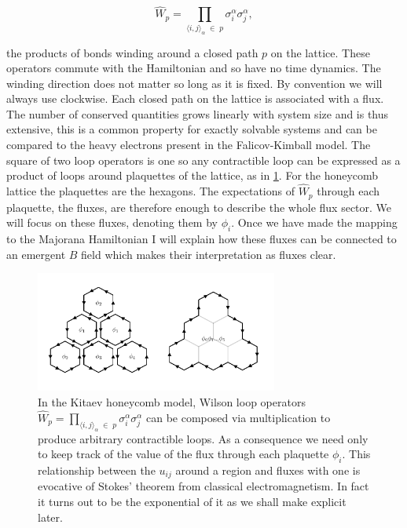 \[\hat{W}_p = \prod_{\langle i,j\rangle_\alpha\; \in\; p} \sigma_i^{\alpha}\sigma_j^{\alpha},\]

the products of bonds winding around a closed path \(p\) on the lattice. These operators commute with the Hamiltonian and so have no time dynamics. The winding direction does not matter so long as it is fixed. By convention we will always use clockwise. Each closed path on the lattice is associated with a flux. The number of conserved quantities grows linearly with system size and is thus extensive, this is a common property for exactly solvable systems and can be compared to the heavy electrons present in the Falicov-Kimball model. The square of two loop operators is one so any contractible loop can be expressed as a product of loops around plaquettes of the lattice, as in \cref{fig:stokes_theorem}. For the honeycomb lattice the plaquettes are the hexagons. The expectations of \(\hat{W}_p\) through each plaquette, the fluxes, are therefore enough to describe the whole flux sector. We will focus on these fluxes, denoting them by \(\phi_i\). Once we have made the mapping to the Majorana Hamiltonian I will explain how these fluxes can be connected to an emergent \(B\) field which makes their interpretation as fluxes clear.

\hypertarget{fig:stokes_theorem}{%
\begin{figure}
\centering
\includegraphics[width=0.71\textwidth,height=\textheight]{figure_code/amk_chapter/stokes_theorem/stokes_theorem}
\caption[{We can construct arbitrary loops from plaquette fluxes.}]{In the Kitaev honeycomb model, Wilson loop operators \(\hat{W}_p = \prod_{\langle i,j\rangle_\alpha\; \in\; p} \sigma_i^{\alpha}\sigma_j^{\alpha}\) can be composed via multiplication to produce arbitrary contractible loops. As a consequence we need only to keep track of the value of the flux through each plaquette \(\phi_i\). This relationship between the \(u_{ij}\) around a region and fluxes with one is evocative of Stokes' theorem from classical electromagnetism. In fact it turns out to be the exponential of it as we shall make explicit later.}
\label{fig:stokes_theorem}
\end{figure}
}

